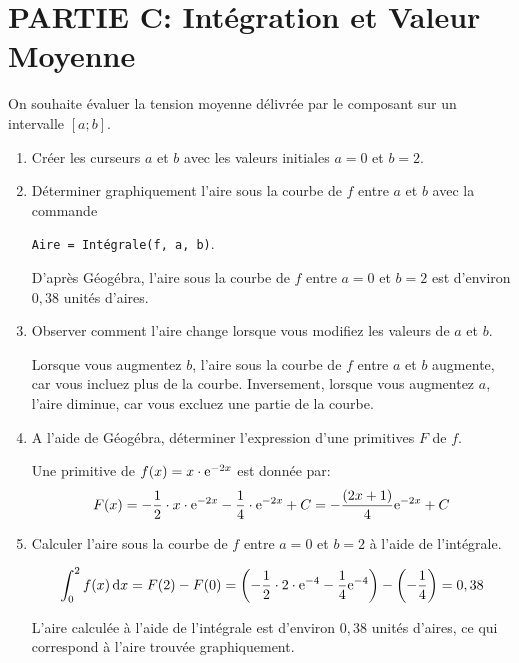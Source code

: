 \documentclass[11pt, a4paper]{report}
\begin{document}
\pagebreak
\thispagestyle{DS_LP}

\section*{PARTIE C\@: Intégration et Valeur Moyenne}

On souhaite évaluer la tension moyenne délivrée par le composant sur un intervalle $[a ; b]$.

\begin{enumerate}[resume]
    \item Créer les curseurs $a$ et $b$ avec les valeurs initiales $a=0$ et $b=2$.  
    \item Déterminer graphiquement l'aire sous la courbe de $f$ entre $a$ et $b$ avec la commande 
    
    \verb|Aire = Intégrale(f, a, b)|.  
    \begin{blocvisible}[height=2]
        D'après Géogébra, l'aire sous la courbe de $f$ entre $a=0$ et $b=2$ est d'environ $0,38$ unités d'aires.
    \end{blocvisible}
        
    \item Observer comment l'aire change lorsque vous modifiez les valeurs de $a$ et $b$. 
    \begin{blocvisible}[height=3]
        Lorsque vous augmentez $b$, l'aire sous la courbe de $f$ entre $a$ et $b$ augmente, car vous incluez plus de la courbe. Inversement, lorsque vous augmentez $a$, l'aire diminue, car vous excluez une partie de la courbe.
    \end{blocvisible}

    \item A l'aide de Géogébra, déterminer l'expression d'une primitives $F$ de $f$. 
    \begin{blocvisible}[height=2]
        Une primitive de $f(x) = x \cdot\mathrm{e}^{-2x}$ est donnée par:
        \[F(x) = -\frac{1}{2}\cdot x \cdot\mathrm{e}^{-2x} - \frac{1}{4}\cdot \mathrm{e}^{-2x} + C= -\frac{(2x + 1)}{4}\mathrm{e}^{-2x} + C\]
    \end{blocvisible}

    \item Calculer l'aire sous la courbe de $f$ entre $a=0$ et $b=2$ à l'aide de l'intégrale. 
    \begin{blocvisible}[height=3]
        \[\int_0^2 f(x) \,\mathrm{d}x = F(2) - F(0) = \left(-\frac{1}{2} \cdot 2 \cdot \mathrm{e}^{-4} - \frac{1}{4} \mathrm{e}^{-4}\right) - \left(-\frac{1}{4}\right) = 0,38\]

        L'aire calculée à l'aide de l'intégrale est d'environ $0,38$ unités d'aires, ce qui correspond à l'aire trouvée graphiquement.
    \end{blocvisible}
    

\end{enumerate}
\end{document}
